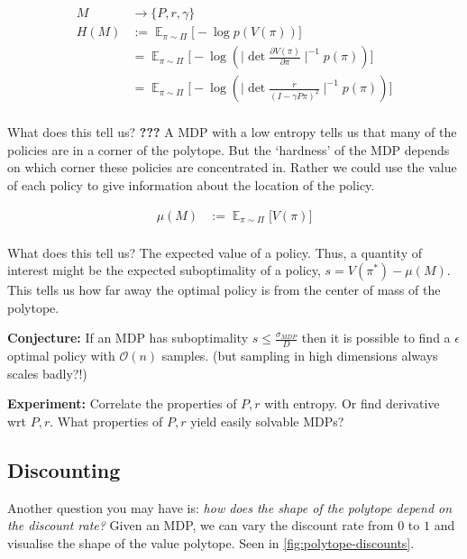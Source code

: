 \begin{align}
M &\to \{P, r, \gamma\} \tag{a MDP}\\
H(M) &:= \mathop{\mathbb E}_{\pi\sim\Pi}\Big[-\log p(V(\pi)) \Big]\\
&= \mathop{\mathbb E}_{\pi\sim\Pi}\Big[-\log(\mid \det\frac{\partial V(\pi)}{\partial \pi}\mid^{-1}p(\pi)) \Big] \\
&= \mathop{\mathbb E}_{\pi\sim\Pi}\Big[-\log(\mid \det \frac{r}{(I-\gamma P \pi)^2}\mid^{-1}p(\pi)) \Big] \\
\end{align}

What does this tell us? \textbf{???} A MDP with a low entropy tells us
that many of the policies are in a corner of the polytope. But the
`hardness' of the MDP depends on which corner these policies are
concentrated in. Rather we could use the value of each policy to give
information about the location of the policy.

\begin{align*}
\mu(M) &:= \mathop{\mathbb E}_{\pi\sim\Pi}\Big[V(\pi) \Big]\\
\end{align*}

What does this tell us? The expected value of a policy. Thus, a quantity
of interest might be the expected suboptimality of a policy,
\(s = V(\pi^{* })-\mu(M)\). This tells us how far away the optimal
policy is from the center of mass of the polytope.

\textbf{Conjecture:} If an MDP has suboptimality
\(s \le \frac{\sigma_{MDP}}{D}\) then it is possible to find a
\(\epsilon\) optimal policy with \(\mathcal O(n)\) samples. (but
sampling in high dimensions always scales badly?!)

\textbf{Experiment:} Correlate the properties of \(P, r\) with entropy.
Or find derivative wrt \(P, r\). What properties of \(P, r\) yield
easily solvable MDPs?

\subsection{Discounting}

Another question you may have is: \textit{how does the shape of the polytope depend on the discount rate?}
Given an MDP, we can vary the discount rate from \(0\) to \(1\) and visualise
the shape of the value polytope. Seen in \ref{fig:polytope-discounts}.

